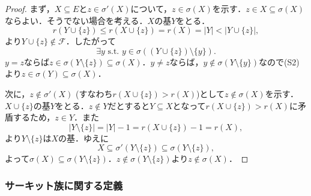\documentclass[xelatex,ja=standard,a4paper,14pt,everyparhook=compat]{bxjsarticle}
\theoremstyle{definition}
\begin{document}
\begin{proof}
    まず，$X \subseteq E$と$z \in \sigma'(X)$について，$z \in \sigma(X)$を示す．$z \in X \subseteq \sigma(X)$ならよい．そうでない場合を考える．$X$の基$Y$をとる． \begin{equation*}
        r(Y \cup \{z\}) \leq r(X \cup \{z\}) = r(X) = |Y| < |Y \cup \{z\}|,
    \end{equation*}
    より$Y \cup \{z\} \notin \mathcal{F}$．したがって \begin{equation*}
        \text{$\exists y$ s.t. $y \in \sigma((Y \cup \{z\}) \setminus \{y\})$.}
    \end{equation*}
    $y = z$ならば$z \in \sigma(Y \setminus \{z\}) \subseteq \sigma(X)$．$y \neq z$ならば，$y \notin \sigma(Y \setminus \{y\})$なので(S2)より$z \in \sigma(Y) \subseteq \sigma(X)$．

    次に，$z \notin \sigma'(X)$ (すなわち$r(X \cup \{z\}) > r(X)$)として$z \notin \sigma(X)$を示す．$X \cup \{z\}$の基$Y$をとる．$z \notin Y$だとすると$Y \subseteq X$となって$r(X \cup \{z\}) > r(X)$に矛盾するため，$z \in Y$．また \begin{equation*}
        |Y \setminus \{z\}| = |Y| - 1 = r(X \cup \{z\}) - 1 = r(X),
    \end{equation*}
    より$Y \setminus \{z\}$は$X$の基．ゆえに \begin{equation*}
        X \subseteq \sigma'(Y \setminus \{z\}) \subseteq \sigma(Y \setminus \{z\}),
    \end{equation*}
    よって$\sigma(X) \subseteq \sigma(Y \setminus \{z\})$．$z \notin \sigma(Y \setminus \{z\})$より$z \notin \sigma(X)$．
\end{proof}

\subsubsection*{サーキット族に関する定義}
\end{document}
